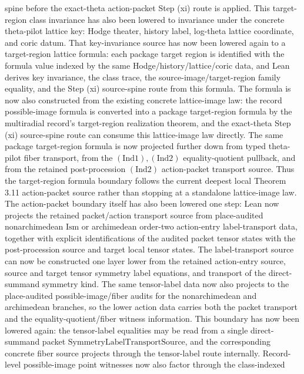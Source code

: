 \begin{proposition}
  spine before the exact-theta action-packet Step (xi) route is applied.  This
  target-region class invariance has also been lowered to invariance under the
  concrete theta-pilot lattice key: Hodge theater, history label, log-theta
  lattice coordinate, and coric datum.  That key-invariance source has now been
  lowered again to a target-region lattice formula: each package target region
  is identified with the formula value indexed by the same
  Hodge/history/lattice/coric data, and Lean derives key invariance, the class
  trace, the source-image/target-region family equality, and the Step (xi)
  source-spine route from this formula.  The formula is now also constructed
  from the existing concrete lattice-image law: the record possible-image
  formula is converted into a package target-region formula by the
  multiradial record's target-region realization theorem, and the exact-theta
  Step (xi) source-spine route can consume this lattice-image law directly.
  The same package target-region formula is now projected further down from
  typed theta-pilot fiber transport, from the \((\mathrm{Ind}1),(\mathrm{Ind}2)\)
  equality-quotient pullback, and from the retained post-procession
  \((\mathrm{Ind}2)\) action-packet transport source.  Thus the target-region
  formula boundary follows the current deepest local Theorem 3.11
  action-packet source rather than stopping at a standalone lattice-image law.
  The action-packet boundary itself has also been lowered one step: Lean now
  projects the retained packet/action transport source from place-audited
  nonarchimedean \(\mathrm{Ism}\) or archimedean order-two action-entry
  label-transport data, together with explicit identifications of the audited
  packet tensor states with the post-procession source and target local tensor
  states.  The label-transport source can now be constructed one layer lower
  from the retained action-entry source, source and target tensor symmetry
  label equations, and transport of the direct-summand symmetry kind.  The same
  tensor-label data now also projects to the place-audited possible-image/fiber
  audits for the nonarchimedean and archimedean branches, so the lower action
  data carries both the packet transport and the equality-quotient/fiber witness
  information.  This boundary has now been lowered again: the tensor-label
  equalities may be read from a single direct-summand packet
  \(\mathrm{SymmetryLabelTransportSource}\), and the corresponding concrete
  fiber source projects through the tensor-label route internally.  Record-level
  possible-image point witnesses now also factor through the class-indexed

\end{proposition}
